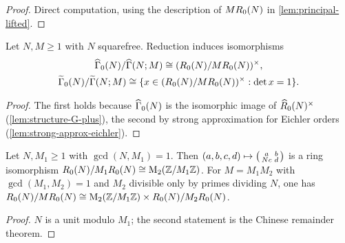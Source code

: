 \begin{proof}
Direct computation, using the description of $MR_{0}(N)$ in
\cref{lem:principal-lifted}.
\end{proof}

\begin{proposition}\label{prop:det-one-quotients}
Let $N, M \geq 1$ with $N$ squarefree. Reduction induces isomorphisms
\begin{gather*}
  \GammaZero[ad]{N}/\GammaPrincipal[ad]{N}{M} \cong
  \unit{(\EichlerOrder{N}/M\EichlerOrder{N})},\\
  \GammaZero[lift]{N}/\GammaPrincipal[lift]{N}{M} \cong
  \{x \in \unit{(\EichlerOrder{N}/M\EichlerOrder{N})} : \det x = 1\}.
\end{gather*}
\end{proposition}

\begin{proof}
The first holds because $\GammaZero[ad]{N}$ is the isomorphic image of
$\widehat{R}_{0}(N)^{\times}$ (\cref{lem:structure-G-plus}), the second by
strong approximation for Eichler orders (\cref{lem:strong-approx-eichler}).
\end{proof}

\begin{lemma}\label{lem:prime-to-N}
Let $N, M_1 \geq 1$ with $\gcd(N, M_1) = 1$. Then
$(a,b,c,d) \mapsto \left(\begin{smallmatrix} a & b \\ Nc & d \end{smallmatrix}\right)$ is a ring
isomorphism $R_{0}(N)/M_1R_{0}(N) \cong \mathrm{M}_{2}(\mathbb{Z}/M_1\mathbb{Z})$.
For $M = M_1M_2$ with $\gcd(M_1, M_2) = 1$ and $M_2$ divisible only by
primes dividing $N$, one has
$R_{0}(N)/MR_{0}(N) \cong \mathrm{M}_{2}(\mathbb{Z}/M_1\mathbb{Z}) \times
R_{0}(N)/M_2R_{0}(N)$.
\end{lemma}

\begin{proof}
$N$ is a unit modulo $M_1$; the second statement is the Chinese remainder
theorem.
\end{proof}

